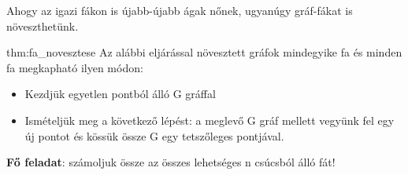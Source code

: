Ahogy az igazi fákon is újabb-újabb ágak nőnek, ugyanúgy gráf-fákat
is növeszthetünk. 
\begin{theorem}{thm:fa_novesztese}
	Az alábbi eljárással növesztett gráfok mindegyike fa és minden fa
	megkapható ilyen módon: 
	\begin{itemize}
		\item Kezdjük egyetlen pontból álló G gráffal 
		\item Ismételjük meg a következő lépést: a meglevő G gráf mellett vegyünk
		fel egy új pontot és kössük össze G egy tetszőleges pontjával.\\
		
	\end{itemize}
\end{theorem}
\begin{extraproblem}
\textbf{Fő feladat}: számoljuk össze az összes lehetséges n csúcsból
álló fát! 
\end{extraproblem}
